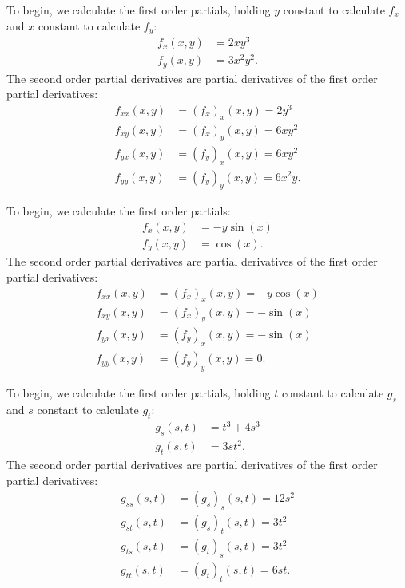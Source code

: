 \begin{activitySolution}
	\ba
	\item To begin, we calculate the first order partials, holding $y$ constant to calculate $f_x$ and $x$ constant to calculate $f_y$:
\begin{align*}
f_x(x,y) &= 2xy^3 \\
f_y(x,y) &= 3x^2y^2.
\end{align*}
The second order partial derivatives are partial derivatives of the
first order partial derivatives: 
\begin{align*}
f_{xx}(x,y) &= (f_x)_x(x,y) = 2y^3 \\
f_{xy}(x,y) &= (f_x)_y(x,y) = 6xy^2 \\
f_{yx}(x,y) &= (f_y)_x(x,y) = 6xy^2 \\
f_{yy}(x,y) &= (f_y)_y(x,y) = 6x^2y.
\end{align*}	
		
	\item To begin, we calculate the first order partials:
\begin{align*}
f_x(x,y) &= -y\sin(x) \\
f_y(x,y) &= \cos(x).
\end{align*}
The second order partial derivatives are partial derivatives of the first order partial derivatives:
\begin{align*}
f_{xx}(x,y) &= (f_x)_x(x,y) = -y\cos(x) \\
f_{xy}(x,y) &= (f_x)_y(x,y) = -\sin(x) \\
f_{yx}(x,y) &= (f_y)_x(x,y) = -\sin(x) \\
f_{yy}(x,y) &= (f_y)_y(x,y) = 0.
\end{align*}	
	
	\item To begin, we calculate the first order partials, holding $t$ constant to calculate $g_s$ and $s$ constant to calculate $g_t$:
\begin{align*}
g_s(s,t) &= t^3+4s^3 \\
g_t(s,t) &= 3st^2.
\end{align*}
The second order partial derivatives are partial derivatives of the first order partial derivatives:
\begin{align*}
g_{ss}(s,t) &= (g_s)_s(s,t) = 12s^2 \\
g_{st}(s,t) &= (g_s)_t(s,t) = 3t^2 \\
g_{ts}(s,t) &= (g_t)_s(s,t) = 3t^2 \\
g_{tt}(s,t) &= (g_t)_t(s,t) = 6st.
\end{align*}	

	
	\ea
\end{activitySolution}
\aftera
